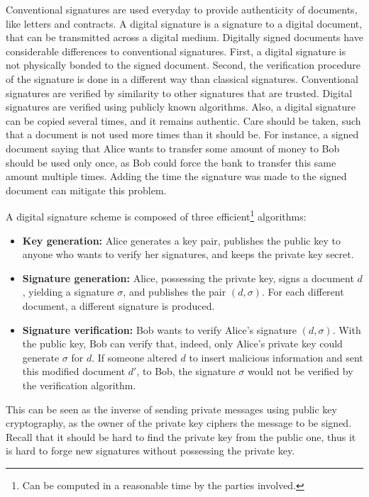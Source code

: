 \documentclass{ufsctex/ufsctex}
\begin{document}
Conventional signatures are used everyday to provide authenticity of documents,
like letters and contracts. A digital signature is a signature to a digital
document, that can be transmitted across a digital medium. Digitally signed
documents have considerable differences to conventional signatures. First, a
digital signature is not physically bonded to the signed document. Second, the
verification procedure of the signature is done in a different way than
classical signatures. Conventional signatures are verified by similarity to
other signatures that are trusted. Digital signatures are verified using
publicly known algorithms. Also, a digital signature can be copied several
times, and it remains authentic. Care should be taken, such that a document is
not used more times than it should be.  For instance, a signed document saying
that Alice wants to transfer some amount of money to Bob should be used only
once, as Bob could force the bank to transfer this same amount multiple times.
Adding the time the signature was made to the signed document can mitigate this
problem.

A digital signature scheme is composed of three efficient\footnote{Can be
computed in a reasonable time by the parties involved.} algorithms:

\begin{itemize}

	\item \textbf{Key generation:} Alice generates a key pair, publishes the
	public key to anyone who wants to verify her signatures, and keeps the
	private key secret.

	\item \textbf{Signature generation:} Alice, possessing the private key,
	signs a document $d$, yielding a signature $\sigma$, and publishes the pair
	$(d, \sigma)$. For each different document, a different signature is
	produced.

	\item \textbf{Signature verification:} Bob wants to verify Alice's
	signature $(d, \sigma)$. With the public key, Bob can verify that, indeed,
	only Alice's private key could generate $\sigma$ for $d$. If someone
	altered $d$ to insert malicious information and sent this modified document
	$d'$, to Bob, the signature $\sigma$ would not be verified by the
	verification algorithm.

\end{itemize}

This can be seen as the inverse of sending private messages using public key
cryptography, as the owner of the private key ciphers the message to be signed.
Recall that it should be hard to find the private key from the public one, thus
it is hard to forge new signatures without possessing the private key.
\end{document}
